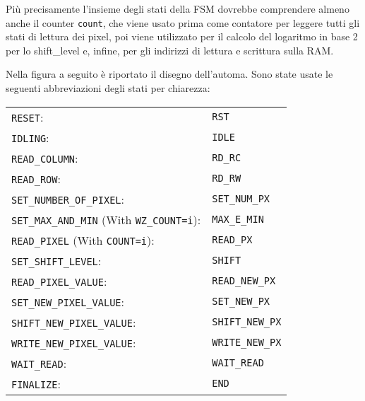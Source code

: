 \documentclass{article}
\begin{document}
Più precisamente l'insieme degli stati della FSM dovrebbe comprendere almeno anche il counter \texttt{count}, che viene usato prima come contatore per leggere tutti gli stati di lettura dei pixel, poi viene utilizzato per il calcolo del logaritmo in base 2 per lo shift\_level e, infine, per gli indirizzi di lettura e scrittura sulla RAM.


Nella figura a seguito è riportato il disegno dell'automa. Sono state usate le seguenti abbreviazioni degli stati per chiarezza:\\

\begin{center}
\begin{tabular}{ll}
\texttt{RESET}: & \texttt{RST} \\
\texttt{IDLING}: & \texttt{IDLE} \\
\texttt{READ\_COLUMN}: & \texttt{RD\_RC} \\
\texttt{READ\_ROW}: & \texttt{RD\_RW} \\
\texttt{SET\_NUMBER\_OF\_PIXEL}: & \texttt{SET\_NUM\_PX} \\
\texttt{SET\_MAX\_AND\_MIN} (With \texttt{WZ\_COUNT=i}): & \texttt{MAX\_E\_MIN} \\
\texttt{READ\_PIXEL} (With \texttt{COUNT=i}): & \texttt{READ\_PX} \\
\texttt{SET\_SHIFT\_LEVEL}: & \texttt{SHIFT} \\
\texttt{READ\_PIXEL\_VALUE}: & \texttt{READ\_NEW\_PX} \\
\texttt{SET\_NEW\_PIXEL\_VALUE}: & \texttt{SET\_NEW\_PX} \\
\texttt{SHIFT\_NEW\_PIXEL\_VALUE}: & \texttt{SHIFT\_NEW\_PX} \\
\texttt{WRITE\_NEW\_PIXEL\_VALUE}: & \texttt{WRITE\_NEW\_PX} \\
\texttt{WAIT\_READ}: & \texttt{WAIT\_READ} \\
\texttt{FINALIZE}: & \texttt{END} \\
\end{tabular}
\end{center}
\end{document}
